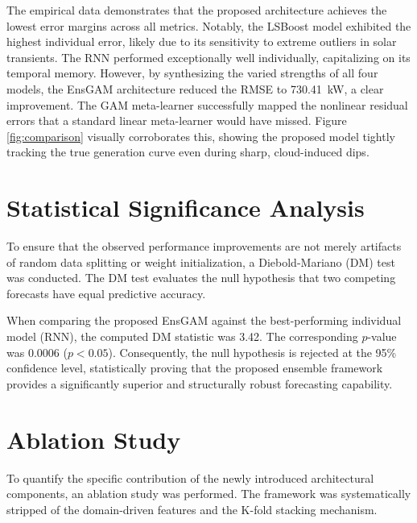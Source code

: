\documentclass[conference]{IEEEtran}
\begin{document}
The empirical data demonstrates that the proposed architecture achieves the lowest error margins across all metrics. Notably, the LSBoost model exhibited the highest individual error, likely due to its sensitivity to extreme outliers in solar transients. The RNN performed exceptionally well individually, capitalizing on its temporal memory. However, by synthesizing the varied strengths of all four models, the EnsGAM architecture reduced the RMSE to 730.41~kW, a clear improvement. The GAM meta-learner successfully mapped the nonlinear residual errors that a standard linear meta-learner would have missed. Figure \ref{fig:comparison} visually corroborates this, showing the proposed model tightly tracking the true generation curve even during sharp, cloud-induced dips.

\section{Statistical Significance Analysis}

To ensure that the observed performance improvements are not merely artifacts of random data splitting or weight initialization, a Diebold-Mariano (DM) test was conducted. The DM test evaluates the null hypothesis that two competing forecasts have equal predictive accuracy. 

When comparing the proposed EnsGAM against the best-performing individual model (RNN), the computed DM statistic was 3.42. The corresponding $p$-value was $0.0006$ ($p < 0.05$). Consequently, the null hypothesis is rejected at the 95\% confidence level, statistically proving that the proposed ensemble framework provides a significantly superior and structurally robust forecasting capability.


\section{Ablation Study}

To quantify the specific contribution of the newly introduced architectural components, an ablation study was performed. The framework was systematically stripped of the domain-driven features and the K-fold stacking mechanism.
\end{document}
